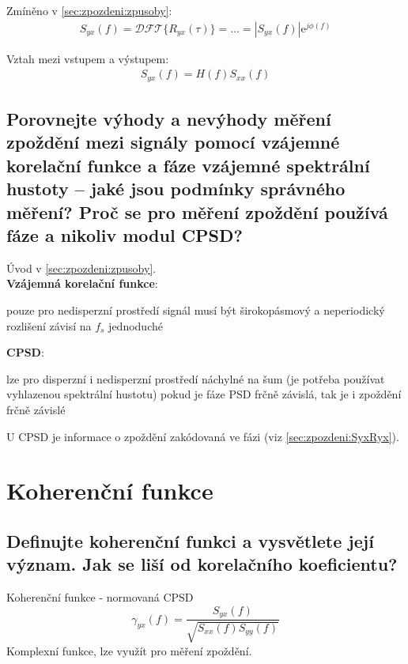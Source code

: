 \documentclass[a4paper,12pt]{article}   %
\newcommand{\mt}[1]{$#1$}
\newcommand{\e}{\text{e}}
\begin{document}
Zmíněno v \ref{sec:zpozdeni:zpusoby}:
\begin{align*}
        S_{yx}(f) = \mathscr{DFT}\{R_{yx}(\tau)\} = \dots = |S_{yx}(f)|\e^{j\phi(f)}
\end{align*}

Vztah mezi vstupem a výstupem:
\begin{align*}
        S_{yx}(f) = H(f) S_{xx}(f) 
\end{align*}



\subsection{Porovnejte výhody a nevýhody měření zpoždění mezi signály pomocí vzájemné korelační funkce a fáze vzájemné spektrální hustoty – jaké jsou podmínky správného měření? Proč se pro měření zpoždění používá fáze a nikoliv modul CPSD?}
Úvod v \ref{sec:zpozdeni:zpusoby}.\\
\textbf{Vzájemná korelační funkce}:
\begin{outline}
        \1 pouze pro nedisperzní prostředí 
        \1 signál musí být širokopásmový a neperiodický
        \1 rozlišení závisí na \mt{f_s}
        \1 jednoduché
\end{outline}

\textbf{CPSD}:
\begin{outline}
        \1 lze pro disperzní i nedisperzní prostředí
        \1 náchylné na šum (je potřeba používat vyhlazenou spektrální hustotu)
        \1 pokud je fáze PSD frčně závislá, tak je i zpoždění frčně závislé
\end{outline}

U CPSD je informace o zpoždění zakódovaná ve fázi (viz \ref{sec:zpozdeni:SyxRyx}).





\newpage \section{Koherenční funkce}
\subsection{Definujte koherenční funkci a vysvětlete její význam. Jak se liší od korelačního koeficientu?}
Koherenční funkce - normovaná CPSD
\begin{equation}
        \gamma_{yx}(f) = \frac{S_{yx}(f)}{\sqrt{S_{xx}(f)S_{yy}(f)}}
\end{equation}
Komplexní funkce, lze využít pro měření zpoždění.
\end{document}
